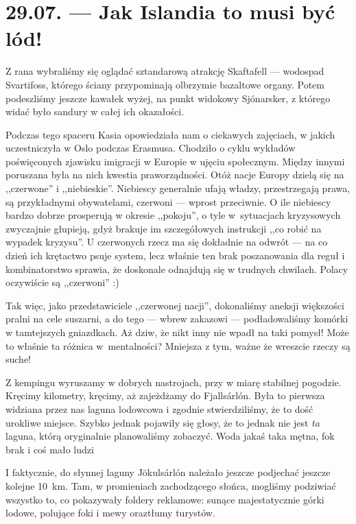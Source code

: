 \chapter*{29.07. --- Jak Islandia to musi być lód!}

Z rana wybraliśmy się oglądać sztandarową atrakcję Skaftafell --- wodospad Svartifoss, którego ściany przypominają olbrzymie bazaltowe organy. Potem podeszliśmy jeszcze kawałek wyżej, na punkt widokowy Sjónarsker, z którego widać było sandury w całej ich okazałości.

Podczas tego spaceru Kasia opowiedziała nam o ciekawych zajęciach, w jakich uczestniczyła w Oslo podczas Erasmusa. Chodziło o cyklu wykładów poświęconych zjawisku imigracji w Europie w ujęciu społecznym. Między innymi poruszana była na nich kwestia praworządności. Otóż nacje Europy dzielą się na ,,czerwone'' i ,,niebieskie''. Niebiescy generalnie ufają władzy, przestrzegają prawa, są przykładnymi obywatelami, czerwoni --- wprost przeciwnie. O ile niebiescy bardzo dobrze prosperują w okresie ,,pokoju'', o tyle w~sytuacjach kryzysowych zwyczajnie głupieją, gdyż brakuje im szczegółowych instrukcji ,,co robić na wypadek kryzysu''. U czerwonych rzecz ma się dokładnie na odwrót --- na co dzień ich krętactwo psuje system, lecz właśnie ten brak poszanowania dla reguł i kombinatorstwo sprawia, że doskonale odnajdują się w trudnych chwilach. Polacy oczywiście są ,,czerwoni'' :)


Tak więc, jako przedstawiciele ,,czerwonej nacji'', dokonaliśmy aneksji większości pralni na cele suszarni, a do tego --- wbrew zakazowi --- podładowaliśmy komórki w tamtejszych gniazdkach. Aż dziw, że nikt inny nie wpadł na taki pomysł! Może to właśnie ta różnica w~mentalności? Mniejsza z tym, ważne że wreszcie rzeczy są suche!

Z kempingu wyruszamy w dobrych nastrojach, przy w miarę stabilnej pogodzie. Kręcimy kilometry, kręcimy, aż zajeżdżamy do Fjallsárlón. Była to pierwsza widziana przez nas laguna lodowcowa i zgodnie stwierdziliśmy, że to dość urokliwe miejsce. Szybko jednak pojawiły się głosy, że to jednak nie jest \emph{ta} laguna, którą oryginalnie planowaliśmy zobaczyć. Woda jakaś taka mętna, fok brak i coś mało ludzi\textellipsis

I faktycznie, do słynnej laguny Jökulsárlón należało jeszcze podjechać jeszcze kolejne 10~km. Tam, w promieniach zachodzącego słońca, mogliśmy podziwiać wszystko to, co pokazywały foldery reklamowe: sunące majestatycznie górki lodowe, polujące foki i mewy oraz\textellipsis tłumy turystów.

